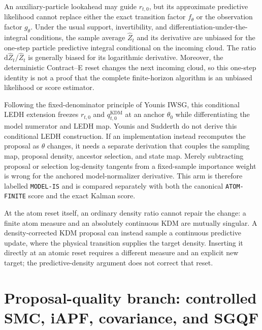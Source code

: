 \documentclass[11pt]{article}
\newcommand{\dd}{\mathrm{d}}
\newcommand{\KDM}{\ensuremath{\mathrm{KDM}}}
\begin{document}
An auxiliary-particle lookahead may guide $r_{t,0}$, but its approximate
predictive likelihood cannot replace either the exact transition factor
$f_\theta$ or the observation factor $g_\theta$.  Under the usual support,
invertibility, and differentiation-under-the-integral conditions, the sample
average $\widehat Z_t$ and its derivative are unbiased for the one-step
particle predictive integral conditional on the incoming cloud.  The ratio
$\dd\widehat Z_t/\widehat Z_t$ is generally biased for its logarithmic
derivative.  Moreover, the deterministic Contract--E reset changes the next
incoming cloud, so this one-step identity is not a proof that the complete
finite-horizon algorithm is an unbiased likelihood or score estimator.

Following the fixed-denominator principle of Younis IWSG, this conditional
LEDH extension freezes $r_{t,0}$ and $q^{\KDM}_{t,0}$ at an anchor $\theta_0$ while
differentiating the model numerator and LEDH map.  Younis and Sudderth do not
derive this conditional LEDH construction.  If an implementation instead
recomputes the proposal as $\theta$ changes, it needs a separate derivation
that couples the sampling map, proposal density, ancestor selection, and state
map.  Merely subtracting proposal or selection log-density tangents from a
fixed-sample importance weight is wrong for the anchored model-normalizer
derivative.  This arm is therefore labelled
\texttt{MODEL-IS} and is compared separately with both the canonical
\texttt{ATOM-FINITE} score and the exact Kalman score.

At the atom reset itself, an ordinary density ratio cannot repair the change:
a finite atom measure and an absolutely continuous KDM are mutually singular.
A density-corrected KDM proposal can instead sample a continuous predictive
update, where the physical transition supplies the target density. Inserting
it directly at an atomic reset requires a different measure and an explicit
new target; the predictive-density argument does not correct that reset.

\section{Proposal-quality branch: controlled SMC, iAPF, covariance, and SGQF}
\label{sec:proposal-quality}
\end{document}
